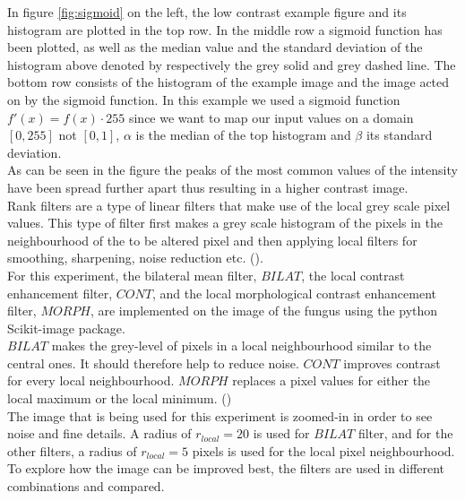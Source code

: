 In figure \ref{fig:sigmoid} on the left, the low contrast example figure and its histogram are plotted in the top row. In the middle row a sigmoid function has been plotted, as well as the median value and the standard deviation of the histogram above denoted by respectively the grey solid and grey dashed line. The bottom row consists of the histogram of the example image and the image acted on by the sigmoid function. In this example we used a sigmoid function $f'(x)=f(x) \cdot 255$ since we want to map our input values on a domain $[0,255]$ not $[0,1]$, $\alpha$ is the median of the top histogram and $\beta$ its standard deviation.\\
As can be seen in the figure the peaks of the most common values of the intensity have been spread further apart thus resulting in a higher contrast image.\\



Rank filters are a type of linear filters that make use of the local grey scale pixel values. This type of filter first makes a grey scale histogram of the pixels in the neighbourhood of the to be altered pixel and then applying local filters for smoothing, sharpening, noise reduction etc. (\cite{rank}).\\
For this experiment, the bilateral mean filter, $BILAT$, the local contrast enhancement filter, $CONT$, and the local morphological contrast enhancement filter, $MORPH$, are implemented on the image of the fungus using the python Scikit-image package.\\
$BILAT$ makes the grey-level of pixels in a local neighbourhood similar to the central ones. It should therefore help to reduce noise. $CONT$ improves contrast for every local neighbourhood. $MORPH$ replaces a pixel values for either the local maximum or the local minimum. (\cite{rank})\\
The image that is being used for this experiment is zoomed-in in order to see noise and fine details. A radius of $r_{local} = 20$ is used for $BILAT$ filter, and for the other filters, a radius of $r_{local} = 5$ pixels is used for the local pixel neighbourhood. To explore how the image can be improved best, the filters are used in different combinations and compared.
\clearpage